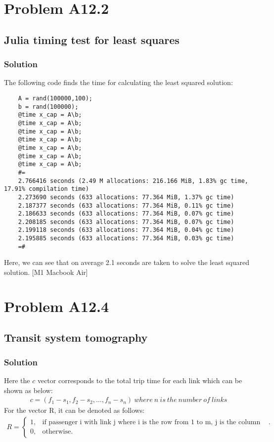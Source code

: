 \documentclass{article}
\begin{document}
\section*{Problem A12.2}
\subsection*{Julia timing test for least squares}
\subsubsection*{Solution}
The following code finds the time for calculating the least squared solution:
    \begin{verbatim}
    A = rand(100000,100);
    b = rand(100000);
    @time x_cap = A\b;
    @time x_cap = A\b;
    @time x_cap = A\b;
    @time x_cap = A\b;
    @time x_cap = A\b;
    @time x_cap = A\b;
    @time x_cap = A\b;
    #=
    2.766416 seconds (2.49 M allocations: 216.166 MiB, 1.83% gc time, 17.91% compilation time)
    2.273690 seconds (633 allocations: 77.364 MiB, 1.37% gc time)
    2.187377 seconds (633 allocations: 77.364 MiB, 0.11% gc time)
    2.186633 seconds (633 allocations: 77.364 MiB, 0.07% gc time)
    2.208185 seconds (633 allocations: 77.364 MiB, 0.07% gc time)
    2.199118 seconds (633 allocations: 77.364 MiB, 0.04% gc time)
    2.195885 seconds (633 allocations: 77.364 MiB, 0.03% gc time)
    =#
    \end{verbatim}
    Here, we can see that on average 2.1 seconds are taken to solve the least squared solution. [M1 Macbook Air]
\section*{Problem A12.4}
\subsection*{Transit system tomography}
\subsubsection*{Solution}
    Here the $c$ vector corresponds to the total trip time for each link which can be shown as below:
    \begin{align*}
        c = (f_1-s_1, f_2-s_2, \ldots, f_n-s_n)\ where\ n\ is\ the\ number\ of\ links
    \end{align*}
    For the vector R, it can be denoted as follows:\\ 
    \begin{align*}
      R=\begin{cases}
        1, & \text{if passenger i with link j where i is the row from 1 to m, j is the column from 1 to n}.\\
        0, & \text{otherwise}.
      \end{cases}
    \end{align*}
    
\end{document}
